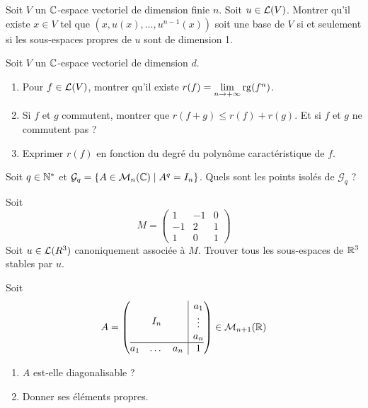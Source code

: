 \documentclass[12pt]{article}
\begin{document}
\begin{exercise}
	Soit $V$ un $\mathbb{C}$-espace vectoriel de dimension finie $n$. Soit $u\in\mathcal{L}(V)$. Montrer qu'il existe $x\in V$ tel que $(x,u(x),\dots,u^{n-1}(x))$ soit une base de $V$ si et seulement si les sous-espaces propres de $u$ sont de dimension 1.
\end{exercise}

\begin{exercise}
	Soit $V$ un $\mathbb{C}$-espace vectoriel de dimension $d$.
	\begin{enumerate}
		\item Pour $f\in\mathcal{L}(V)$, montrer qu'il existe $r(f)=\lim\limits_{n\to+\infty}\operatorname{rg}(f^{n})$.
		\item Si $f$ et $g$ commutent, montrer que $r(f+g)\leqslant r(f)+r(g)$. Et si $f$ et $g$ ne commutent pas ?
		\item Exprimer $r(f)$ en fonction du degré du polynôme caractéristique de $f$.
	\end{enumerate}
\end{exercise}

\begin{exercise}
	Soit $q\in\mathbb{N}^{*}$ et $\mathcal{G}_{q}=\{A\in\mathcal{M}_{n}(\mathbb{C})\mid A^{q}=I_{n}\}$. Quels sont les points isolés de $\mathcal{G}_{q}$ ?
\end{exercise}

\begin{exercise}
	Soit 
	$$
	M=
	\begin{pmatrix}
		1 & -1 & 0\\
		-1 & 2 & 1\\
		1& 0 & 1
	\end{pmatrix}
	$$
	Soit $u\in\mathcal{L}(R^{3})$ canoniquement associée à $M$. Trouver tous les sous-espaces de $\mathbb{R}^{3}$ stables par $u$.
\end{exercise}

\begin{exercise}
	Soit 
	$$
	A=
	\left(
		\begin{array}{@{}c|c@{}}
		I_{n} &
		\begin{matrix}
			a_{1}\\
			\vdots\\
			a_{n}
			\end{matrix}
			\\
		\hline
		\begin{matrix}
			a_{1} &
			\dots
			& a_{n}
			\end{matrix}
			& 1
		\end{array}
		\right)\in\M_{n+1}(\R)
	$$
	\begin{enumerate}
		\item $A$ est-elle diagonalisable ?
		\item Donner ses éléments propres.
	\end{enumerate}
\end{exercise}
\end{document}
